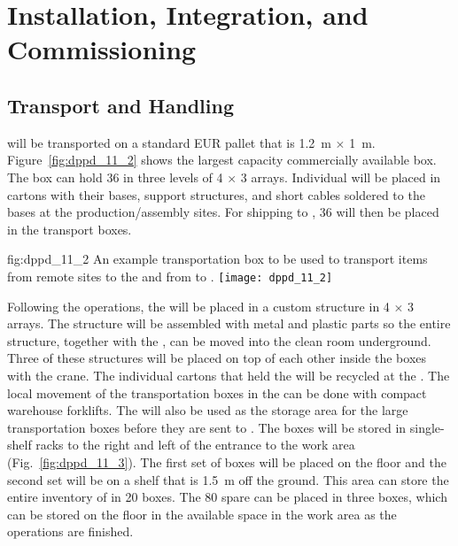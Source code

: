 \section{Installation, Integration, and Commissioning}
\label{sec:dp-pds-installation}

\subsection{Transport and Handling}

 will be transported on a standard EUR pallet that is \SI{1.2}{\m} $\times$ \SI{1}{\m}. Figure~\ref{fig:dppd_11_2} shows the largest capacity commercially available box. The box can hold \num{36}  in three levels of \num{4} $\times$ \num{3} arrays. Individual  will be placed in cartons with their bases, support structures, and short  cables soldered to the bases at the production/assembly sites. For shipping to , \num{36}  will then be placed in the transport boxes.

\begin{dunefigure}{fig:dppd_11_2}
{An example transportation box to be used to transport items from remote sites to the  and from  to \surf.}
\texttt{[image: dppd\_11\_2]}
\end{dunefigure}

Following the  operations, the  will be placed in a custom structure in \num{4} $\times$ \num{3} arrays. The structure will be assembled with metal and plastic parts so the entire structure, together with the , can be moved into the clean room underground. Three of these structures will be placed on top of each other inside the boxes with the crane. The individual cartons that held the  will be recycled at the . The local movement of the transportation boxes in the  can be done with compact warehouse forklifts. The  will also be used as the storage area for the large  transportation boxes before they are sent to \surf. The boxes will be stored in single-shelf racks to the right and left of the entrance to the work area (Fig.~\ref{fig:dppd_11_3}). The first set of boxes will be placed on the floor and the second set will be on a shelf that is \SI{1.5}{\m} off the ground. This area can store the entire \dual {}  inventory of \dpnumpmtch {} in \num{20} boxes. The \num{80} spare  can be placed in three boxes, which can be stored on the floor in the available space in the work area as the \dual {}  operations are finished.

